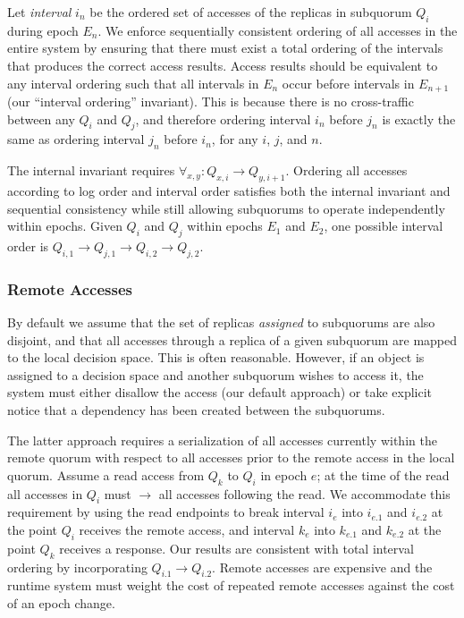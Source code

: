 \documentclass[11pt,letterpaper]{article}
\begin{document}
Let \emph{interval} $i_n$ be the ordered set of accesses of the replicas in subquorum
$Q_i$ during epoch $E_n$.
We enforce sequentially consistent ordering of all accesses in the entire system by
ensuring that there must exist a total ordering of the intervals that produces the correct
access results.
Access results should be equivalent to any interval ordering
such that all intervals in $E_n$ occur before intervals in $E_{n+1}$ (our ``interval
ordering'' invariant).
This is because there is no cross-traffic between any $Q_i$ and $Q_j$, and therefore
ordering interval $i_n$ before $j_n$ is exactly the same as ordering interval $j_n$
before $i_n$, for any $i$, $j$, and $n$.

The internal invariant requires $\forall_{x,y} : Q_{x,i} \rightarrow Q_{y,i+1}$.
Ordering all accesses according to log order and interval order satisfies both the
internal invariant and sequential consistency while still allowing subquorums to operate
independently within epochs.
Given $Q_i$ and $Q_j$ within epochs $E_1$ and $E_2$, one possible interval order is
$Q_{i,1} \rightarrow Q_{j,1} \rightarrow Q_{i,2} \rightarrow Q_{j,2}$.

\subsubsection{Remote Accesses}

By default we assume that the set of replicas \emph{assigned} to subquorums are also
disjoint, and that all accesses through a replica of a given subquorum are mapped to the
local decision space.
This is often reasonable.
However, if an object is assigned to a decision space and another subquorum wishes to
access it, the system must either disallow the access (our default approach) or take
explicit notice that a dependency has been created between the subquorums.

The latter approach requires a serialization of all accesses currently within the remote
quorum with respect to all accesses prior to the remote access in the local quorum.
Assume a read access from $Q_k$ to $Q_i$ in epoch $e$; at the time of the read all
accesses in $Q_i$ must $\rightarrow$ all accesses following the read.
We accommodate this requirement by using the read endpoints to break interval $i_e$ into
$i_{e.1}$ and $i_{e.2}$ at the point $Q_i$ receives the remote access, and interval $k_e$
into $k_{e.1}$ and $k_{e.2}$ at the point $Q_k$ receives a response.
Our results are consistent with total interval ordering by incorporating $Q_{i.1}
\rightarrow Q_{i.2}$.
Remote accesses are expensive and the runtime system must weight the cost of repeated
remote accesses against the cost of an epoch change.
\end{document}
